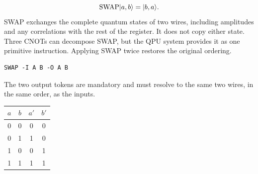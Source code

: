 
\[
\mathrm{SWAP}\lvert a,b\rangle=\lvert b,a\rangle.
\]
SWAP exchanges the complete quantum states of two wires, including amplitudes
and any correlations with the rest of the register. It does not copy either
state. Three CNOTs can decompose SWAP, but the QPU system provides it as one
primitive instruction. Applying SWAP twice restores the original ordering.
\begin{lstlisting}
SWAP -I A B -O A B
\end{lstlisting}
The two output tokens are mandatory and must resolve to the same two wires, in
the same order, as the inputs.
\begin{center}
\begin{tabular}{cc|cc}\toprule $a$&$b$&$a'$&$b'$\\\midrule
0&0&0&0\\0&1&1&0\\1&0&0&1\\1&1&1&1\\\bottomrule
\end{tabular}
\end{center}

